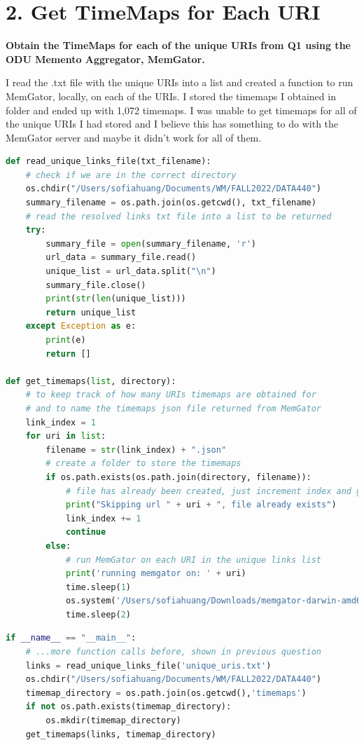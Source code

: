 \documentclass[12pt]{article}
\begin{document}
\section*{2. Get TimeMaps for Each URI}
\noindent \textbf{Obtain the TimeMaps for each of the unique URIs from Q1 using the ODU Memento Aggregator, MemGator.}

I read the .txt file with the unique URIs into a list and created a function to run MemGator, locally,  on each of the URIs. I stored the timemaps I obtained in folder and ended up with 1,072 timemaps. I was unable to get timemaps for all of the unique URIs I had stored and I believe this has something to do with the MemGator server and maybe it didn't work for all of them.

\begin{lstlisting}[language=Python, caption=MemGator to get timemaps for all unique URIs, label=lst:copy]
def read_unique_links_file(txt_filename):
    # check if we are in the correct directory
    os.chdir("/Users/sofiahuang/Documents/WM/FALL2022/DATA440")
    summary_filename = os.path.join(os.getcwd(), txt_filename)
    # read the resolved links txt file into a list to be returned
    try:
        summary_file = open(summary_filename, 'r')
        url_data = summary_file.read()
        unique_list = url_data.split("\n")
        summary_file.close()
        print(str(len(unique_list)))
        return unique_list
    except Exception as e:
        print(e)
        return []

def get_timemaps(list, directory):
    # to keep track of how many URIs timemaps are obtained for
    # and to name the timemaps json file returned from MemGator
    link_index = 1
    for uri in list:
        filename = str(link_index) + ".json"
        # create a folder to store the timemaps
        if os.path.exists(os.path.join(directory, filename)):
            # file has already been created, just increment index and go to the next file
            print("Skipping url " + uri + ", file already exists")
            link_index += 1
            continue
        else:
            # run MemGator on each URI in the unique links list
            print('running memgator on: ' + uri)
            time.sleep(1)
            os.system('/Users/sofiahuang/Downloads/memgator-darwin-amd64 -F 2 -f JSON ' + uri + ' > /Users/sofiahuang/Documents/WM/FALL2022/DATA440/timemaps/' + filename)
            time.sleep(2)
\end{lstlisting}

\begin{lstlisting}[language=Python, caption=Running functions to get timemaps for the URIs, label=lst:copy]
if __name__ == "__main__":
    # ...more function calls before, shown in previous question
    links = read_unique_links_file('unique_uris.txt')
    os.chdir("/Users/sofiahuang/Documents/WM/FALL2022/DATA440")
    timemap_directory = os.path.join(os.getcwd(),'timemaps')
    if not os.path.exists(timemap_directory):
        os.mkdir(timemap_directory)
    get_timemaps(links, timemap_directory)
\end{lstlisting}
\end{document}
